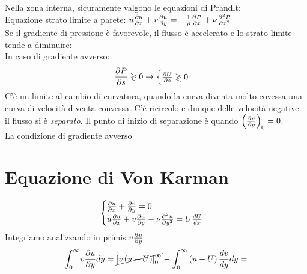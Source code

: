 Nella zona interna, sicuramente valgono le equazioni di Prandlt:\\
Equazione strato limite a parete: $ u\frac{\partial u}{\partial x}+v\frac{\partial u}{\partial y}=-\frac{1}{\rho }\frac{\partial P}{\partial x}+ \nu \frac{\partial^2P}{\partial x^2}$
\\
Se  il gradiente di pressione è favorevole, il flusso è accelerato e lo strato limite tende a diminuire:\\
In caso di gradiente avverso:
\begin{equation*}
  \frac{\partial P}{\partial s}\gtrless 0 \rightarrow 
  \begin{cases}
    \frac{\partial U}{\partial s}\gtrless 0\\
    
  \end{cases}
\end{equation*}
C'è un limite al cambio di curvatura, quando la curva diventa molto covessa una curva di velocità diventa convessa.
C'è ricircolo e dunque delle velocità negative: il flusso si è \emph{separato}.
Il punto di inizio di separazione è quando $ \left( \frac{\partial u}{\partial y}\right)_0 = 0  $.\\
La condizione di gradiente avverso

\section{Equazione di Von Karman}

\begin{equation*}
  \begin{cases}
    \frac{\partial u}{\partial x}+\frac{\partial v}{\partial y}=0\\
    u\frac{\partial u}{\partial x}+v\frac{\partial u}{\partial y}-\nu \frac{\partial^2u}{\partial y^2}=U\frac{d U}{d x}
  \end{cases}
\end{equation*}
Integriamo analizzando in primis $ v\frac{\partial u}{\partial y} $ 
\[
  \displaystyle{\int_{0}^{\infty }}v\frac{\partial u}{\partial y}dy = \cancel{{\left[ v\left( u-U\right) \right] ^\infty _0}} - \displaystyle{\int_{0}^{\infty }}\left( u-U\right) \frac{d v}{d y}dy=
\]


